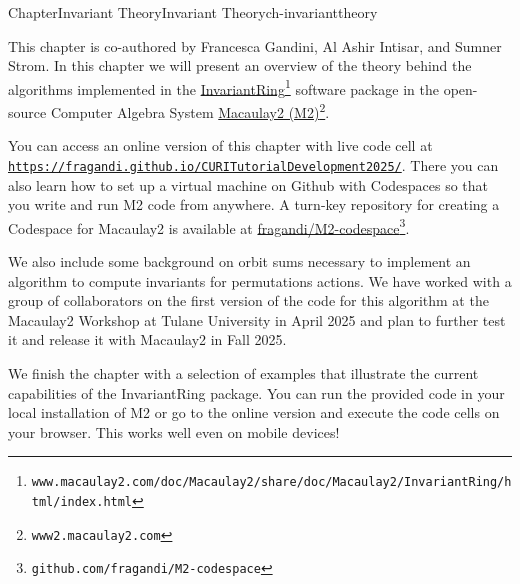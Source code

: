 \documentclass[oneside,10pt,]{book}
\begin{document}
\raggedbottom
%
%
\typeout{************************************************}
\typeout{************************************************}
%
\begin{chapterptx}{Chapter}{Invariant Theory}{}{Invariant Theory}{}{}{ch-invarianttheory}
\renewcommand*{\chaptername}{Chapter}
\begin{introduction}{}%
This chapter is co-authored by Francesca Gandini, Al Ashir Intisar, and Sumner Strom. In this chapter we will present an overview of the theory behind the algorithms implemented in the \href{https://www.macaulay2.com/doc/Macaulay2/share/doc/Macaulay2/InvariantRing/html/index.html}{InvariantRing}\footnote{\nolinkurl{www.macaulay2.com/doc/Macaulay2/share/doc/Macaulay2/InvariantRing/html/index.html}\label{ch-invarianttheory-2-1-2}} software package in the open-source Computer Algebra System \href{http://www2.macaulay2.com}{Macaulay2 (M2)}\footnote{\nolinkurl{www2.macaulay2.com}\label{ch-invarianttheory-2-1-4}}.%
\par
You can access an online version of this chapter with live code cell at \href{https://fragandi.github.io/CURITutorialDevelopment2025/}{\nolinkurl{https://fragandi.github.io/CURITutorialDevelopment2025/}}. There you can also learn how to set up a virtual machine on Github with Codespaces so that you write and run M2 code from anywhere. A turn-key repository for creating a Codespace  for Macaulay2 is available at \href{https://github.com/fragandi/M2-codespace}{fragandi\slash{}M2-codespace}\footnote{\nolinkurl{github.com/fragandi/M2-codespace}\label{ch-invarianttheory-2-2-3}}.%
\par
We also include some background on orbit sums necessary to implement an algorithm to compute invariants for permutations actions. We have worked with a group of collaborators on the first version of the code for this algorithm at the Macaulay2 Workshop at Tulane University in April 2025 and plan to further test it and release it with Macaulay2 in Fall 2025.%
\par
We finish the chapter with a selection of examples that illustrate the current capabilities of the InvariantRing package. You can run the provided code in your local installation of M2 or go to the online version and execute the code cells on your browser. This works  well even on mobile devices!%
\end{introduction}%
%
%
\typeout{************************************************}

\end{chapterptx}
\end{document}
